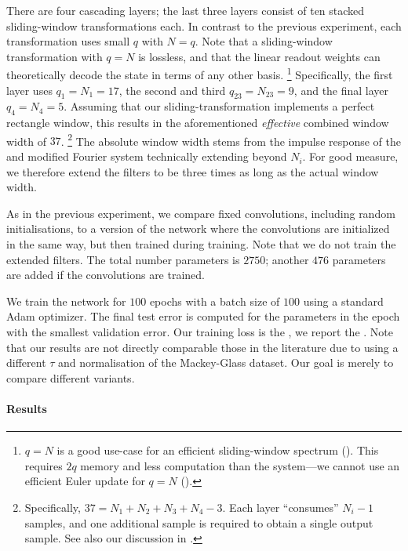 There are four cascading \LMU layers; the last three layers consist of ten stacked sliding-window transformations each.
In contrast to the previous experiment, each transformation uses small $q$ with $N = q$.
Note that a sliding-window transformation with $q = N$ is lossless, and that the linear readout weights can theoretically decode the state in terms of any other basis.%
\footnote{$q = N$ is a good use-case for an efficient sliding-window spectrum ().
This requires $2q$ memory and less computation than the \LDN system---we cannot use an efficient Euler update for $q = N$ ().}
Specifically, the first \LMU layer uses $q_1 = N_1 = 17$, the second and third $q_{23} = N_{23} = 9$, and the final layer $q_{4} = N_4 = 5$.
Assuming that our sliding-transformation implements a perfect rectangle window, this results in the aforementioned \emph{effective} combined window width of $37$.%
\footnote{Specifically, $37 = N_1 + N_2 + N_3 + N_4 - 3$. Each layer \enquote{consumes} $N_i - 1$ samples, and one additional sample is required to obtain a single output sample. See also our discussion in .}
The absolute window width stems from the impulse response of the \LDN and modified Fourier system technically extending beyond $N_i$.
For good measure, we therefore extend the \FIR filters to be three times as long as the actual window width.

As in the previous experiment, we compare fixed convolutions, including random initialisations, to a version of the network where the convolutions are initialized in the same way, but then trained during training.
Note that we do not train the extended filters.
The total number parameters is $2750$; another $476$ parameters are added if the convolutions are trained.

We train the network for $100$ epochs with a batch size of $100$ using a standard Adam optimizer.
The final test error is computed for the parameters in the epoch with the smallest validation error.
Our training loss is the \MSE, we report the \NRMSE.
Note that our results are not directly comparable those in the literature due to using a different $\tau$ and normalisation of the Mackey-Glass dataset.
Our goal is merely to compare different \LMU variants.

\paragraph{Results}

